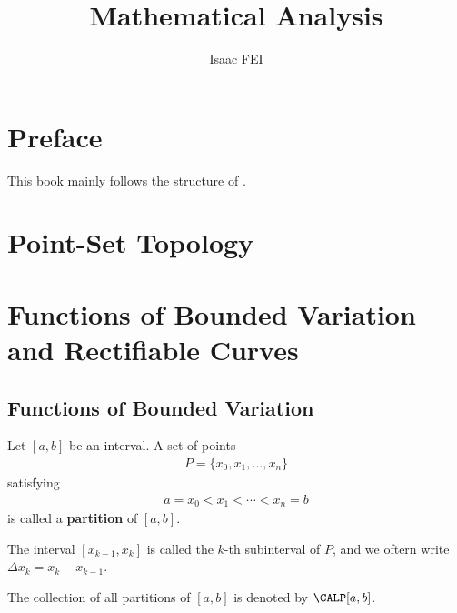 \documentclass[thmcnt=section, color=blue, 12pt]{my-elegantbook}
\title{Mathematical Analysis}
\author{Isaac FEI}
\begin{document}
\maketitle


\frontmatter
\chapter*{Preface}

This book mainly follows the structure of \cite{apostolMathematicalAnalysisModern1974}.


\tableofcontents
\mainmatter



\chapter{Point-Set Topology}


\chapter{Functions of Bounded Variation and Rectifiable Curves}


\section{Functions of Bounded Variation}

\begin{definition}
	Let $[a, b]$ be an interval.
	A set of points
	\begin{align*}
		P = \{ x_0, x_1, \dots, x_n \}
	\end{align*}
	satisfying
	\begin{align*}
		a = x_0 < x_1 < \cdots < x_n = b
	\end{align*}
	is called a \textbf{partition} of $[a, b]$.

	The interval $[x_{k-1}, x_k]$ is called the $k$-th subinterval of $P$,
	and we oftern write $\Delta x_k = x_k - x_{k-1}$.

	The collection of all partitions of $[a, b]$ is denoted by $\CALP [a, b]$.
\end{definition}
\end{document}
